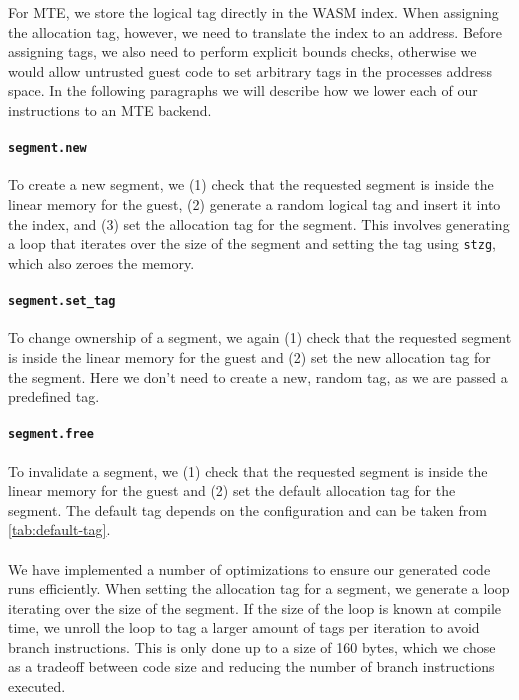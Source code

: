For \ac{MTE}, we store the logical tag directly in the \ac{WASM} index.
When assigning the allocation tag, however, we need to translate the index to an address.
Before assigning tags, we also need to perform explicit bounds checks, otherwise we would allow untrusted guest code to set arbitrary tags in the processes address space.
In the following paragraphs we will describe how we lower each of our instructions to an \ac{MTE} backend.

\paragraph{\lstinline[style=customwasm]{segment.new}} To create a new segment, we (1) check that the requested segment is inside the linear memory for the guest, (2) generate a random logical tag and insert it into the index, and (3) set the allocation tag for the segment.
This involves generating a loop that iterates over the size of the segment and setting the tag using \texttt{stzg}, which also zeroes the memory.

\paragraph{\lstinline[style=customwasm]{segment.set_tag}} To change ownership of a segment, we again (1) check that the requested segment is inside the linear memory for the guest and (2) set the new allocation tag for the segment.
Here we don't need to create a new, random tag, as we are passed a predefined tag.

\paragraph{\lstinline[style=customwasm]{segment.free}} To invalidate a segment, we (1) check that the requested segment is inside the linear memory for the guest and (2) set the default allocation tag for the segment.
The default tag depends on the configuration and can be taken from \cref{tab:default-tag}.

\paragraph{}
We have implemented a number of optimizations to ensure our generated code runs efficiently.
When setting the allocation tag for a segment, we generate a loop iterating over the size of the segment.
If the size of the loop is known at compile time, we unroll the loop to tag a larger amount of tags per iteration to avoid branch instructions.
This is only done up to a size of 160 bytes, which we chose as a tradeoff between code size and reducing the number of branch instructions executed.

